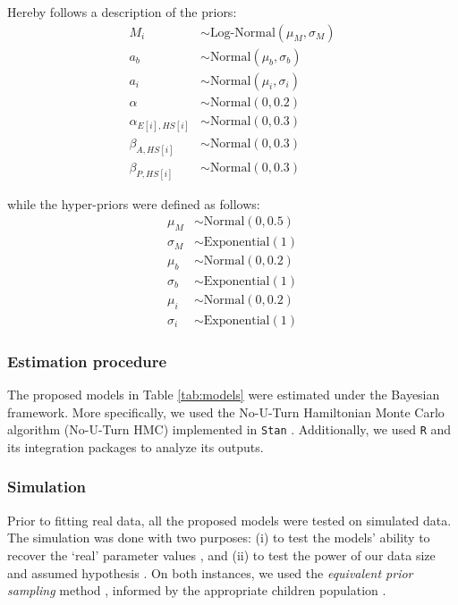 Hereby follows a description of the priors:
%
\begin{align}
	M_{i} & \sim \text{Log-Normal}( \mu_{M}, \sigma_{M}) \\
	a_{b} & \sim \text{Normal}(\mu_{b}, \sigma_{b}) \\
	a_{i} & \sim \text{Normal}(\mu_{i}, \sigma_{i}) \\
	\alpha & \sim \text{Normal}(0, 0.2) \\
	\alpha_{E[i],HS[i]} & \sim \text{Normal}(0, 0.3) \\
	\beta_{A, HS[i]} & \sim \text{Normal}(0 , 0.3) \\
	\beta_{P, HS[i]} & \sim \text{Normal}(0, 0.3)
\end{align}

while the hyper-priors were defined as follows:
%
\begin{align}
	\mu_{M} & \sim \text{Normal}(0, 0.5) \\
	\sigma_{M} & \sim \text{Exponential}(1) \\
	\mu_{b} & \sim \text{Normal}(0, 0.2) \\
	\sigma_{b} & \sim \text{Exponential}(1) \\
	\mu_{i} & \sim \text{Normal}(0, 0.2) \\
	\sigma_{i} & \sim \text{Exponential}(1)
\end{align}
%
%
\subsubsection{Estimation procedure} \label{ssSA:model_estimation}
The proposed models in Table \ref{tab:models} were estimated under the Bayesian framework. More specifically, we used the No-U-Turn Hamiltonian Monte Carlo algorithm (No-U-Turn HMC) \citep{Betancourt_et_al_2013, Duane_et_al_1987, Hoffman_et_al_2014, Neal_2012} implemented in \texttt{Stan} \citep{Stan_2020}. Additionally, we used \texttt{R} \citep{R_2015} and its integration packages \citep{RStan_2020} to analyze its outputs.

\begin{comment}
	\footnote{see \citet{Rivera_2021} (p. 11-13, 15-27) for a detailed description of its benefits and shortcomings.}
\end{comment}
%
%
\subsubsection{Simulation} \label{ssSA:model_simulation}
%
Prior to fitting real data, all the proposed models were tested on simulated data. The simulation was done with two purposes: (i) to test the models' ability to recover the `real' parameter values \cite{Fogarty_et_al_2022}, and (ii) to test the power of our data size and assumed hypothesis \cite{Kruschke_2015}. On both instances, we used the \textit{equivalent prior sampling} method \cite{Winkler_1967}, informed by the appropriate children population \cite{DeRaeve_2016}. 

